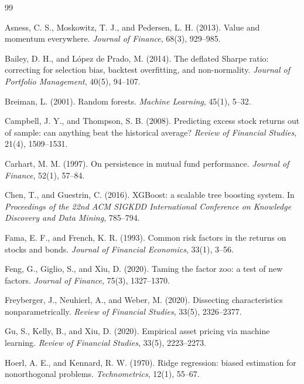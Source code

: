 \documentclass[11pt,a4paper]{article}
\begin{document}
\begin{thebibliography}{99}
\small
\setlength{\itemsep}{1pt}

Asness, C. S., Moskowitz, T. J., and Pedersen, L. H. (2013).
Value and momentum everywhere.
\textit{Journal of Finance}, 68(3), 929--985.

Bailey, D. H., and L\'opez de Prado, M. (2014).
The deflated Sharpe ratio: correcting for selection bias, backtest overfitting, and non-normality.
\textit{Journal of Portfolio Management}, 40(5), 94--107.

Breiman, L. (2001).
Random forests.
\textit{Machine Learning}, 45(1), 5--32.

Campbell, J. Y., and Thompson, S. B. (2008).
Predicting excess stock returns out of sample: can anything beat the historical average?
\textit{Review of Financial Studies}, 21(4), 1509--1531.

Carhart, M. M. (1997).
On persistence in mutual fund performance.
\textit{Journal of Finance}, 52(1), 57--84.

Chen, T., and Guestrin, C. (2016).
XGBoost: a scalable tree boosting system.
In \textit{Proceedings of the 22nd ACM SIGKDD International Conference on Knowledge Discovery and Data Mining}, 785--794.

Fama, E. F., and French, K. R. (1993).
Common risk factors in the returns on stocks and bonds.
\textit{Journal of Financial Economics}, 33(1), 3--56.

Feng, G., Giglio, S., and Xiu, D. (2020).
Taming the factor zoo: a test of new factors.
\textit{Journal of Finance}, 75(3), 1327--1370.

Freyberger, J., Neuhierl, A., and Weber, M. (2020).
Dissecting characteristics nonparametrically.
\textit{Review of Financial Studies}, 33(5), 2326--2377.

Gu, S., Kelly, B., and Xiu, D. (2020).
Empirical asset pricing via machine learning.
\textit{Review of Financial Studies}, 33(5), 2223--2273.

Hoerl, A. E., and Kennard, R. W. (1970).
Ridge regression: biased estimation for nonorthogonal problems.
\textit{Technometrics}, 12(1), 55--67.


\end{thebibliography}
\end{document}
